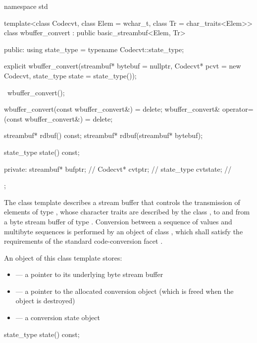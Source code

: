 %
\begin{codeblock}
namespace std {
  template<class Codecvt, class Elem = wchar_t, class Tr = char_traits<Elem>>
    class wbuffer_convert : public basic_streambuf<Elem, Tr> {
    public:
      using state_type = typename Codecvt::state_type;

      explicit wbuffer_convert(streambuf* bytebuf = nullptr,
                               Codecvt* pcvt = new Codecvt,
                               state_type state = state_type());

      ~wbuffer_convert();

      wbuffer_convert(const wbuffer_convert&) = delete;
      wbuffer_convert& operator=(const wbuffer_convert&) = delete;

      streambuf* rdbuf() const;
      streambuf* rdbuf(streambuf* bytebuf);

      state_type state() const;

    private:
      streambuf* bufptr;            // \expos
      Codecvt* cvtptr;              // \expos
      state_type cvtstate;          // \expos
  };
}
\end{codeblock}

\pnum
The class template describes a stream buffer that controls the
transmission of elements of type , whose character traits are
described by the class , to and from a byte stream buffer of type
. Conversion between a sequence of  values and
multibyte sequences is performed by an object of class
, which shall satisfy the requirements
of the standard code-conversion facet .

\pnum
An object of this class template stores:

\begin{itemize}
\item {} --- a pointer to its underlying byte stream buffer
\item {} --- a pointer to the allocated conversion object
(which is freed when the  object is destroyed)
\item {} --- a conversion state object
\end{itemize}

%
\begin{itemdecl}
state_type state() const;
\end{itemdecl}

